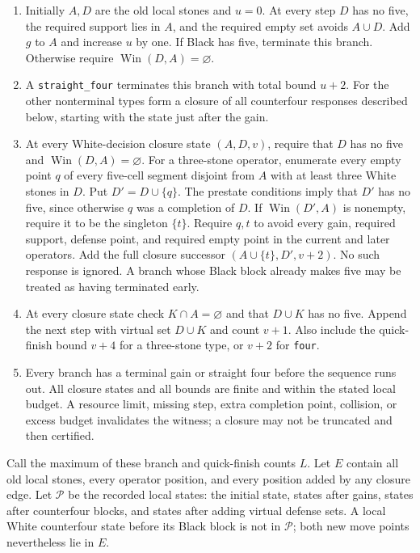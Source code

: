 \documentclass[11pt]{article}
\theoremstyle{definition}
\theoremstyle{remark}
\newcommand{\Win}{\operatorname{Win}}
\begin{document}
\begin{enumerate}
\item Initially \(A,D\) are the old local stones and \(u=0\). At every step \(D\) has no five, the required support lies in \(A\), and the required empty set avoids \(A\cup D\). Add \(g\) to \(A\) and increase \(u\) by one. If Black has five, terminate this branch. Otherwise require \(\Win(D,A)=\varnothing\).
\item A \texttt{straight\_four} terminates this branch with total bound \(u+2\). For the other nonterminal types form a closure of all counterfour responses described below, starting with the state just after the gain.
\item At every White-decision closure state \((A,D,v)\), require that $D$ has no five and \(\Win(D,A)=\varnothing\). For a three-stone operator, enumerate every empty point \(q\) of every five-cell segment disjoint from \(A\) with at least three White stones in \(D\). Put \(D'=D\cup\{q\}\). The prestate conditions imply that $D'$ has no five, since otherwise $q$ was a completion of $D$. If \(\Win(D',A)\) is nonempty, require it to be the singleton \(\{t\}\). Require \(q,t\) to avoid every gain, required support, defense point, and required empty point in the current and later operators. Add the full closure successor \((A\cup\{t\},D',v+2)\). No such response is ignored. A branch whose Black block already makes five may be treated as having terminated early.
\item At every closure state check \(K\cap A=\varnothing\) and that \(D\cup K\) has no five. Append the next step with virtual set \(D\cup K\) and count \(v+1\). Also include the quick-finish bound \(v+4\) for a three-stone type, or \(v+2\) for \texttt{four}.
\item Every branch has a terminal gain or straight four before the sequence runs out. All closure states and all bounds are finite and within the stated local budget. A resource limit, missing step, extra completion point, collision, or excess budget invalidates the witness; a closure may not be truncated and then certified.

\end{enumerate}
Call the maximum of these branch and quick-finish counts \(L\). Let \(E\) contain all old local stones, every operator position, and every position added by any closure edge. Let \(\mathcal P\) be the recorded local states: the initial state, states after gains, states after counterfour blocks, and states after adding virtual defense sets. A local White counterfour state before its Black block is not in \(\mathcal P\); both new move points nevertheless lie in \(E\).
\end{document}
